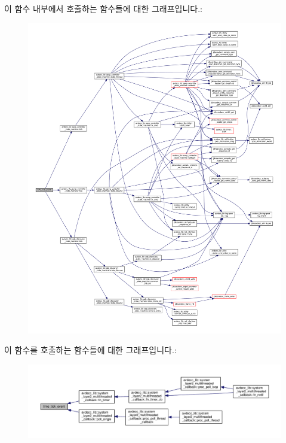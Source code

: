 이 함수 내부에서 호출하는 함수들에 대한 그래프입니다.\+:
\nopagebreak
\begin{figure}[H]
\begin{center}
\leavevmode
\includegraphics[width=350pt]{classavdecc__lib_1_1controller__imp_a3bd2381fee8ed2f308397b2b0433931e_cgraph}
\end{center}
\end{figure}




이 함수를 호출하는 함수들에 대한 그래프입니다.\+:
\nopagebreak
\begin{figure}[H]
\begin{center}
\leavevmode
\includegraphics[width=350pt]{classavdecc__lib_1_1controller__imp_a3bd2381fee8ed2f308397b2b0433931e_icgraph}
\end{center}
\end{figure}



